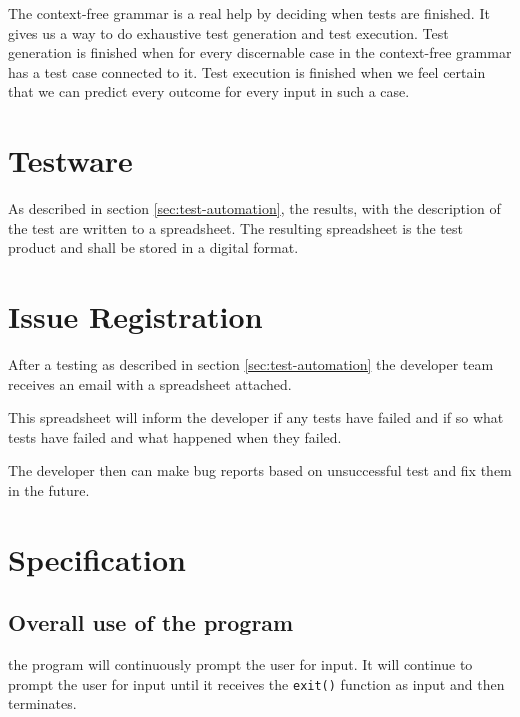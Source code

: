 \documentclass[11pt,a4paper]{article}
\begin{document}
The context-free grammar is a real help by deciding when tests are finished. It gives us a way to do exhaustive test generation and test execution.
Test generation is finished when for every discernable case in the context-free grammar has a test case connected to it.
Test execution is finished when we feel certain that we can predict every outcome for every input in such a case.



\section{Testware}

As described in section \ref{sec:test-automation}, the results, with
the description of the test are written to a spreadsheet. The
resulting spreadsheet is the test product and shall be stored in a
digital format.


\section{Issue Registration}

After a testing as described in section \ref{sec:test-automation} the
developer team receives an email with a spreadsheet attached.

This spreadsheet will inform the developer if any tests have failed
and if so what tests have failed and what happened when they failed.

The developer then can make bug reports based on unsuccessful test and
fix them in the future.


\appendix
\section{Specification} \label{app:specification}
\subsection{Overall use of the program}
the program will continuously prompt the user for input. It will
continue to prompt the user for input until it receives the
\texttt{exit()} function as input and then terminates.
\end{document}
